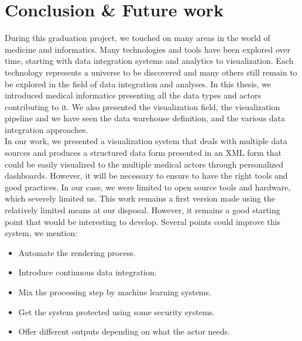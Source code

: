 \chapter{Conclusion \& Future work}
During this graduation project, we touched on many areas in the world of medicine and informatics. Many technologies and tools have been explored over time, starting with data integration systems and analytics to visualization. Each technology represents a universe to be discovered and many others still remain to be explored in the field of data integration and analyses.
\bigbreak
In this thesis, we introduced medical informatics presenting all the data types and actors contributing to it. We also presented the visualization field, the visualization pipeline and we have seen the data warehouse definition, and the various data integration approaches.\\
In our work, we presented a visualization system that deals with multiple data sources and produces a structured data form presented in an XML form that could be easily visualized to the multiple medical actors through personalized dashboards. However, it will be necessary to ensure to have the right tools and good practices. In our case, we were limited to open source tools and hardware, which severely limited us.
\bigbreak
This work remains a first version made using the relatively limited means at our disposal. However, it remains a good starting point that would be interesting to develop. Several points could improve this system, we mention:
\begin{itemize}
\renewcommand{\labelitemi}{$\bullet$}
\item Automate the rendering process.
\item Introduce continuous data integration.
\item Mix the processing step by machine learning systems.
\item Get the system protected using some security systems.
\item Offer different outputs depending on what the actor needs.
\end{itemize}
